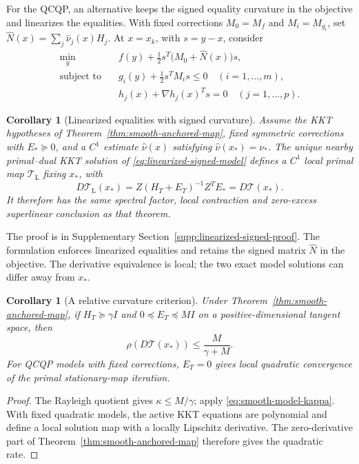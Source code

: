 \documentclass[pdflatex,sn-mathphys-num]{sn-jnl}
\theoremstyle{thmstyleone}
\newtheorem{corollary}[theorem]{Corollary}
\theoremstyle{thmstylethree}
\begin{document}
For the QCQP, an alternative keeps the signed equality curvature in the
objective and linearizes the equalities. With fixed corrections
$M_0=M_f$ and $M_i=M_{g_i}$, set
$\widehat N(x)=\sum_j\widehat\nu_j(x)H_j$. At $x=x_k$, with $s=y-x$, consider
\begin{equation}\tag{$P_k$}\label{eq:linearized-signed-model}
 \begin{aligned}
 \min_y\quad &f(y)+\tfrac12s^T\bigl(M_0+\widehat N(x)\bigr)s,\\
 \text{subject to}\quad
 &g_i(y)+\tfrac12s^TM_is\leq0\quad(i=1,\ldots,m),\\
 &h_j(x)+\nabla h_j(x)^Ts=0\quad(j=1,\ldots,p).
 \end{aligned}
\end{equation}

\begin{corollary}[Linearized equalities with signed curvature]
\label{cor:linearized-signed-map}
Assume the KKT hypotheses of Theorem~\ref{thm:smooth-anchored-map},
fixed symmetric corrections with $E_*\succeq0$, and a $C^1$ estimate
$\widehat\nu(x)$ satisfying $\widehat\nu(x_*)=\nu_*$.
The unique nearby primal--dual KKT solution of \eqref{eq:linearized-signed-model}
defines a $C^1$ local primal map $\mathcal T_{\mathrm L}$ fixing $x_*$, with
\[
 D\mathcal T_{\mathrm L}(x_*)=Z(H_T+E_T)^{-1}Z^TE_*
                    =D\mathcal T(x_*).
\]
It therefore has the same spectral factor, local contraction and
zero-excess superlinear conclusion as that theorem.
\end{corollary}

The proof is in Supplementary Section~\ref{supp:linearized-signed-proof}.
The formulation enforces linearized equalities and retains the signed
matrix $\widehat N$ in the objective. The derivative equivalence is local;
the two exact model solutions can differ away from $x_*$.


\begin{corollary}[A relative curvature criterion]\label{cor:relative-curvature}
Under Theorem~\ref{thm:smooth-anchored-map}, if
$H_T\succeq\gamma I$ and $0\preceq E_T\preceq MI$ on a
positive-dimensional tangent space, then
\[
 \rho(D\mathcal T(x_*))\leq\frac{M}{\gamma+M}.
\]
For QCQP models with fixed corrections, $E_T=0$ gives local quadratic
convergence of the primal stationary-map iteration.
\end{corollary}
\begin{proof}
The Rayleigh quotient gives $\kappa\leq M/\gamma$; apply
\eqref{eq:smooth-model-kappa}. With fixed quadratic models, the active
KKT equations are polynomial and define a local solution map with a
locally Lipschitz derivative. The zero-derivative part of
Theorem~\ref{thm:smooth-anchored-map} therefore gives the quadratic rate.
\end{proof}
\end{document}
